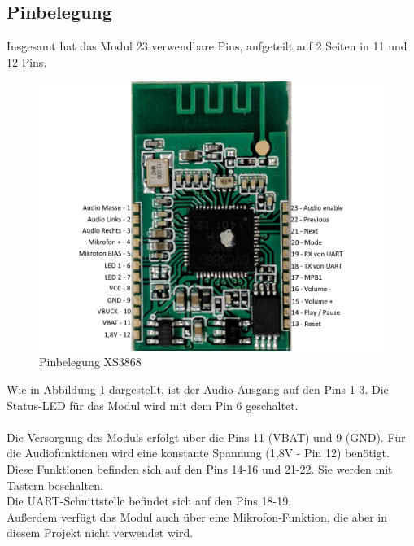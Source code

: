 
\subsection*{Pinbelegung} \label{subsec:4.1.4}
Insgesamt hat das Modul 23 verwendbare Pins, aufgeteilt auf 2 Seiten in 11 und 12 Pins.
\begin{figure} [H]
	\centering
	\includegraphics[width=1\textwidth]{img/BTModul/XS3868_Pinbelegung.png}
	\caption{Pinbelegung XS3868}\label {fig:4.1.4.1}
\end{figure}
Wie in Abbildung \ref{fig:4.1.4.1} dargestellt, ist der Audio-Ausgang auf den Pins 1-3.
Die Status-LED für das Modul wird mit dem Pin 6 geschaltet.
\\ \\
Die Versorgung des Moduls erfolgt über die Pins 11 (VBAT) und 9 (GND).
Für die Audiofunktionen wird eine konstante Spannung (1,8V - Pin 12) benötigt.
Diese Funktionen befinden sich auf den Pins 14-16 und 21-22.
Sie werden mit Tastern beschalten.
\\
Die UART-Schnittstelle befindet sich auf den Pins 18-19.
\\
Außerdem verfügt das Modul auch über eine Mikrofon-Funktion, die aber in diesem Projekt nicht verwendet wird.
\newpage


